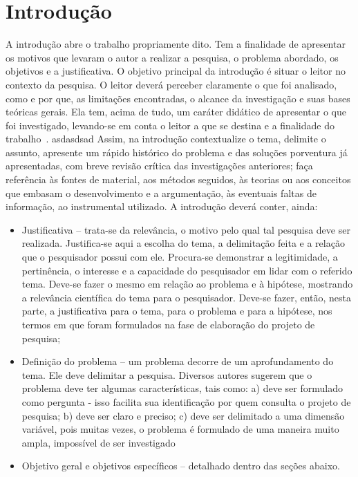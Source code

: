 \chapter{Introdução}\label{cap:introducao}


A introdução abre o trabalho propriamente dito. Tem a finalidade de apresentar os motivos que levaram o autor a realizar a pesquisa, o problema abordado, os objetivos e a justificativa. O objetivo principal da introdução é situar o leitor no contexto da pesquisa. O leitor deverá perceber claramente o que foi analisado, como e por que, as limitações encontradas, o alcance da investigação e suas bases teóricas gerais. Ela tem, acima de tudo, um caráter didático de apresentar o que foi investigado, levando-se em conta o leitor a que se destina e a finalidade do trabalho~\cite{ifsc:manual:normalizacao}. 
asdasdsad
Assim, na introdução contextualize o tema, delimite o assunto, apresente um rápido histórico do problema e das soluções porventura já apresentadas, com breve revisão crítica das investigações anteriores; faça referência às fontes de material, aos métodos seguidos, às teorias ou aos conceitos que embasam o desenvolvimento e a argumentação, às eventuais faltas de informação, ao instrumental utilizado. A introdução deverá conter, ainda:

\begin{itemize}
   \item Justificativa -- trata-se da relevância, o motivo pelo qual tal pesquisa deve ser realizada. Justifica-se aqui a escolha do tema, a delimitação feita e a relação que o pesquisador possui com ele. Procura-se demonstrar a legitimidade, a pertinência, o interesse e a capacidade do pesquisador em lidar com o referido tema. Deve-se fazer o mesmo em relação ao problema e à hipótese, mostrando a relevância científica do tema para o pesquisador. Deve-se fazer, então, nesta parte, a justificativa para o tema, para o problema e para a hipótese, nos termos em que foram formulados na fase de elaboração do projeto de pesquisa;
   
   \item Definição do problema -- um problema decorre de um aprofundamento do tema. Ele deve delimitar a pesquisa. Diversos autores sugerem que o problema deve ter algumas características, tais como: a) deve ser formulado como pergunta - isso facilita sua identificação por quem consulta o projeto de pesquisa; b) deve ser claro e preciso; c) deve ser delimitado a uma dimensão variável, pois muitas vezes, o problema é formulado de uma maneira muito ampla, impossível de ser investigado 
   
   \item Objetivo geral e objetivos específicos -- detalhado dentro das seções abaixo.
\end{itemize}

